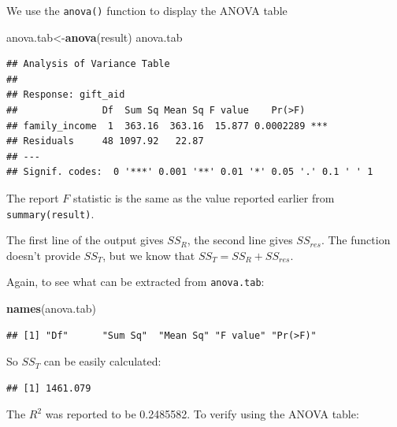 \documentclass[
]{book}
\newenvironment{Shaded}{\begin{snugshade}}{\end{snugshade}}
\newcommand{\FunctionTok}[1]{\textcolor[rgb]{0.13,0.29,0.53}{\textbf{#1}}}
\newcommand{\NormalTok}[1]{#1}
\newcommand{\OtherTok}[1]{\textcolor[rgb]{0.56,0.35,0.01}{#1}}
\newcommand{\SpecialCharTok}[1]{\textcolor[rgb]{0.81,0.36,0.00}{\textbf{#1}}}
\newcommand{\StringTok}[1]{\textcolor[rgb]{0.31,0.60,0.02}{#1}}
\begin{document}
We use the \texttt{anova()} function to display the ANOVA table

\begin{Shaded}
\begin{Highlighting}[]
\NormalTok{anova.tab}\OtherTok{\textless{}{-}}\FunctionTok{anova}\NormalTok{(result)}
\NormalTok{anova.tab}
\end{Highlighting}
\end{Shaded}

\begin{verbatim}
## Analysis of Variance Table
## 
## Response: gift_aid
##               Df  Sum Sq Mean Sq F value    Pr(>F)    
## family_income  1  363.16  363.16  15.877 0.0002289 ***
## Residuals     48 1097.92   22.87                      
## ---
## Signif. codes:  0 '***' 0.001 '**' 0.01 '*' 0.05 '.' 0.1 ' ' 1
\end{verbatim}

The report \(F\) statistic is the same as the value reported earlier from \texttt{summary(result)}.

The first line of the output gives \(SS_{R}\), the second line gives \(SS_{res}\). The function doesn't provide \(SS_T\), but we know that \(SS_T = SS_{R} + SS_{res}\).

Again, to see what can be extracted from \texttt{anova.tab}:

\begin{Shaded}
\begin{Highlighting}[]
\FunctionTok{names}\NormalTok{(anova.tab)}
\end{Highlighting}
\end{Shaded}

\begin{verbatim}
## [1] "Df"      "Sum Sq"  "Mean Sq" "F value" "Pr(>F)"
\end{verbatim}

So \(SS_T\) can be easily calculated:

\begin{Shaded}
\end{Shaded}

\begin{verbatim}
## [1] 1461.079
\end{verbatim}

The \(R^2\) was reported to be 0.2485582. To verify using the ANOVA table:
\end{document}
